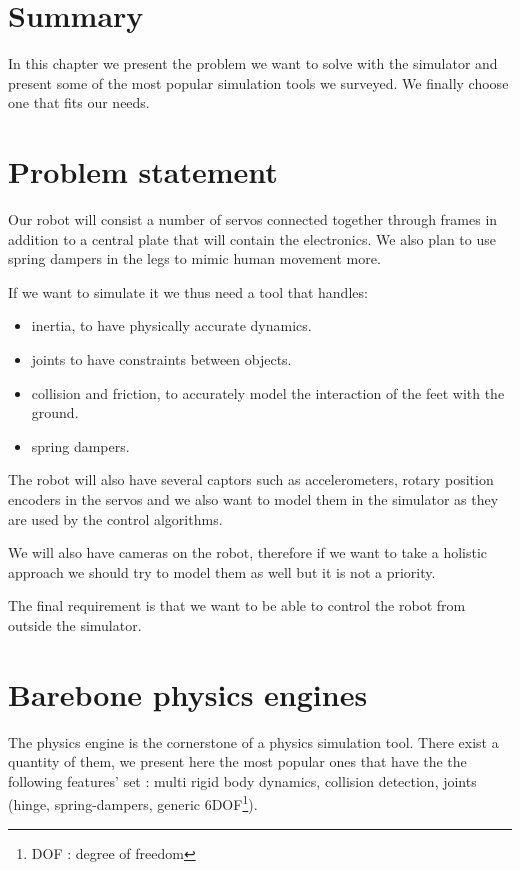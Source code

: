 \section*{Summary}
In this chapter we present the problem we want to solve with the simulator and present some of the most popular simulation tools we surveyed. We finally choose one that fits our needs.

\section{Problem statement}
Our robot will consist a number of servos connected together through frames in addition to a central plate that will contain the electronics. We also plan to use spring dampers in the legs to mimic human movement more.

If we want to simulate it we thus need a tool that handles:\begin{itemize}
\item inertia, to have physically accurate dynamics.
\item joints to have constraints between objects.
\item collision and friction, to accurately model the interaction of the feet with the ground.
\item spring dampers.
\end{itemize}

The robot will also have several captors such as accelerometers, rotary position encoders in the servos and we also want to model them in the simulator as they are used by the control algorithms.

We will also have cameras on the robot, therefore if we want to take a holistic approach we should try to model them as well but it is not a priority. 

The final requirement is that we want to be able to control the robot from outside the simulator.

\section{Barebone physics engines}
The physics engine is the cornerstone of a physics simulation tool. There exist a quantity of them, we present here the most popular ones that have the the following features' set :  multi rigid body dynamics, collision detection, joints (hinge, spring-dampers, generic 6DOF\footnote{DOF : degree of freedom}). 

